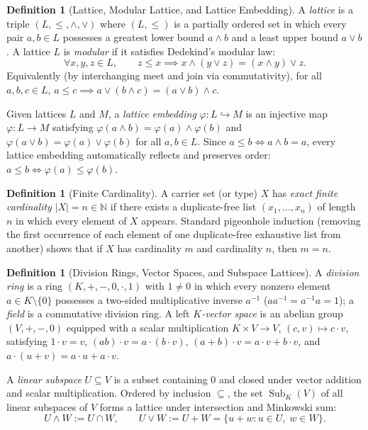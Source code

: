 \documentclass[11pt]{article}
\theoremstyle{definition}
\newtheorem{definition}[theorem]{Definition}
\newcommand{\Sub}{\operatorname{Sub}}
\begin{document}
\begin{definition}[Lattice, Modular Lattice, and Lattice Embedding]\label{def:lattice}
A \emph{lattice} is a triple $(L, \le, \wedge, \vee)$ where $(L, \le)$ is a partially
ordered set in which every pair $a, b \in L$ possesses a greatest lower bound
$a \wedge b$ and a least upper bound $a \vee b$. A lattice $L$ is \emph{modular} if it
satisfies Dedekind's modular law:
\begin{equation}\label{eq:modular}
  \forall x, y, z \in L,\qquad z \le x \implies x \wedge (y \vee z) = (x \wedge y) \vee z.
\end{equation}
Equivalently (by interchanging meet and join via commutativity), for all $a, b, c \in L$,
$a \le c \implies a \vee (b \wedge c) = (a \vee b) \wedge c$.

Given lattices $L$ and $M$, a \emph{lattice embedding} $\varphi : L \hookrightarrow M$ is
an injective map $\varphi : L \to M$ satisfying $\varphi(a \wedge b) = \varphi(a) \wedge
\varphi(b)$ and $\varphi(a \vee b) = \varphi(a) \vee \varphi(b)$ for all $a, b \in L$.
Since $a \le b \iff a \wedge b = a$, every lattice embedding automatically reflects and
preserves order: $a \le b \iff \varphi(a) \le \varphi(b)$.
\end{definition}

\begin{definition}[Finite Cardinality]\label{def:card}
A carrier set (or type) $X$ has \emph{exact finite cardinality} $|X| = n \in \mathbb{N}$
if there exists a duplicate-free list $(x_1, \dots, x_n)$ of length $n$ in which every
element of $X$ appears. Standard pigeonhole induction (removing the first occurrence of
each element of one duplicate-free exhaustive list from another) shows that if $X$ has
cardinality $m$ and cardinality $n$, then $m = n$.
\end{definition}

\begin{definition}[Division Rings, Vector Spaces, and Subspace Lattices]\label{def:subspace}
A \emph{division ring} is a ring $(K, +, -, 0, \cdot, 1)$ with $1 \ne 0$ in which every
nonzero element $a \in K \setminus \{0\}$ possesses a two-sided multiplicative inverse
$a^{-1}$ ($a a^{-1} = a^{-1} a = 1$); a \emph{field} is a commutative division ring.
A left \emph{$K$-vector space} is an abelian group $(V, +, -, 0)$ equipped with a scalar
multiplication $K \times V \to V$, $(c, v) \mapsto c \cdot v$, satisfying $1 \cdot v = v$,
$(ab) \cdot v = a \cdot (b \cdot v)$, $(a + b) \cdot v = a \cdot v + b \cdot v$, and
$a \cdot (u + v) = a \cdot u + a \cdot v$.

A \emph{linear subspace} $U \subseteq V$ is a subset containing $0$ and closed under
vector addition and scalar multiplication. Ordered by inclusion $\subseteq$, the set
$\Sub_K(V)$ of all linear subspaces of $V$ forms a lattice under intersection and
Minkowski sum:
\[
  U \wedge W := U \cap W, \qquad
  U \vee W := U + W = \{u + w : u \in U,\; w \in W\}.
\]
\end{definition}
\end{document}
